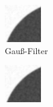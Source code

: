 \documentclass[conference]{IEEEtran}
\begin{document}
\begin{figure}
\begin{subfigure}[b]{0.4\textwidth}
    \includegraphics[width=\linewidth]{img/cut/gaussian_filtered.png}
    \caption{Gauß-Filter}
    \label{fig:2}
  \end{subfigure}
  \begin{subfigure}[b]{0.4\textwidth}
    \includegraphics[width=\linewidth]{img/cut/gaussian_filtered.png}

\end{subfigure}
\end{figure}
\end{document}

